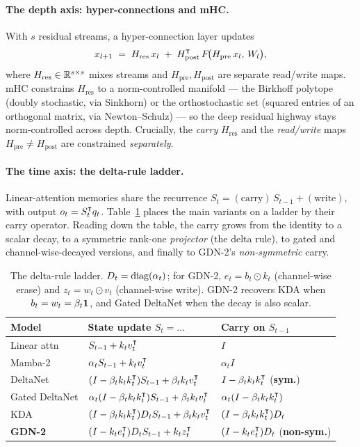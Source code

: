 \documentclass[11pt,letterpaper,logo]{yalearxiv}
\newcommand{\Hres}{H_{\mathrm{res}}}
\newcommand{\Hpre}{H_{\mathrm{pre}}}
\newcommand{\Hpost}{H_{\mathrm{post}}}
\begin{document}
\paragraph{The depth axis: hyper-connections and mHC.}
With $s$ residual streams, a hyper-connection layer updates
\begin{equation}
  x_{l+1} \;=\; \Hres\, x_l \;+\; \Hpost^{\tr}\, F\!\big(\Hpre\, x_l,\, W_l\big),
  \label{eq:hc}
\end{equation}
where $\Hres \in \R^{s\times s}$ mixes streams and $\Hpre,\Hpost$ are separate
read/write maps. mHC \citep{deepseek2025mhc} constrains $\Hres$ to a norm-controlled
manifold --- the Birkhoff polytope (doubly stochastic, via Sinkhorn) or the
orthostochastic set (squared entries of an orthogonal matrix, via Newton--Schulz) ---
so the deep residual highway stays norm-controlled across depth. Crucially, the
\emph{carry} $\Hres$ and the \emph{read/write} maps $\Hpre \neq \Hpost$ are
constrained \emph{separately}.

\paragraph{The time axis: the delta-rule ladder.}
Linear-attention memories share the recurrence $S_t = (\text{carry})\, S_{t-1} +
(\text{write})$, with output $o_t = S_t^{\intercal} q_t$. Table~\ref{tab:ladder} places the
main variants on a ladder by their carry operator. Reading down the table, the carry
grows from the identity to a scalar decay, to a symmetric rank-one \emph{projector}
(the delta rule), to gated and channel-wise-decayed versions, and finally to GDN-2's
\emph{non-symmetric} carry.

\begin{table}[t]
\centering
\small
\begin{tabular}{@{}lll@{}}
\toprule
Model & State update $S_t=\dots$ & Carry on $S_{t-1}$ \\
\midrule
Linear attn & $S_{t-1} + k_t v_t^{\intercal}$ & $I$ \\
Mamba-2 & $\alpha_t S_{t-1} + k_t v_t^{\intercal}$ & $\alpha_t I$ \\
DeltaNet & $(I - \beta_t k_t k_t^{\intercal})S_{t-1} + \beta_t k_t v_t^{\intercal}$ & $I - \beta_t k_t k_t^{\intercal}$ (\textbf{sym.}) \\
Gated DeltaNet & $\alpha_t(I - \beta_t k_t k_t^{\intercal})S_{t-1} + \beta_t k_t v_t^{\intercal}$ & $\alpha_t(I - \beta_t k_t k_t^{\intercal})$ \\
KDA & $(I - \beta_t k_t k_t^{\intercal})D_t S_{t-1} + \beta_t k_t v_t^{\intercal}$ & $(I - \beta_t k_t k_t^{\intercal})D_t$ \\
\textbf{GDN-2} & $(I - k_t e_t^{\intercal})D_t S_{t-1} + k_t z_t^{\intercal}$ & $(I - k_t e_t^{\intercal})D_t$ (\textbf{non-sym.}) \\
\bottomrule
\end{tabular}
\caption{The delta-rule ladder. $D_t=\operatorname{diag}(\alpha_t)$; for GDN-2,
$e_t = b_t \odot k_t$ (channel-wise erase) and $z_t = w_t \odot v_t$
(channel-wise write). GDN-2 recovers KDA when $b_t = w_t = \beta_t \mathbf 1$, and
Gated DeltaNet when the decay is also scalar.}
\label{tab:ladder}
\end{table}
\end{document}
